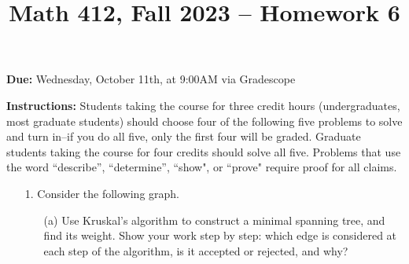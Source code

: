 \documentclass[12pt]{article}
\title{Math 412, Fall 2023 -- Homework 6}
\date{}
\begin{document}
 \maketitle
\vspace{-80pt}

\textbf{Due:} Wednesday, October 11th, at 9:00AM via Gradescope

\textbf{Instructions:} Students taking the course for three credit hours (undergraduates, most graduate
students) should choose four of the following five problems to solve and turn in--if you do all five, only the first four will be graded. Graduate students
taking the course for four credits should solve all five. Problems that use the word ``describe”,
``determine”, ``show", or ``prove" require proof for all claims.

\begin{enumerate}

\item[1.] Consider the following graph.

    \begin{center}
    \end{center}

\begin{enumerate}
    \item[(a)] Use Kruskal's algorithm to construct a minimal spanning tree, and find its weight. Show your work step by step: which edge is considered at each step of the algorithm, is it accepted or rejected, and why?
    

\end{enumerate}
\end{enumerate}
\end{document}
